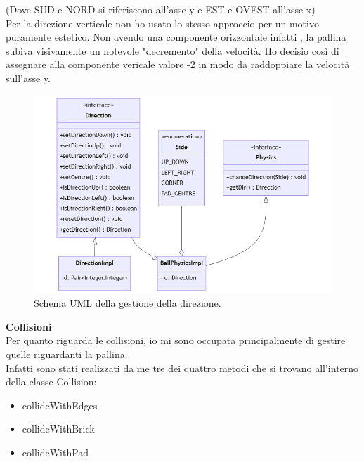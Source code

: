 \documentclass[a4paper,12pt]{report}
\begin{document}
(Dove SUD e NORD si riferiscono all'asse y e EST e OVEST all'asse x)
\\Per la direzione verticale non ho usato lo stesso approccio per un motivo puramente estetico. Non avendo una componente orizzontale infatti , la pallina subiva visivamente un notevole "decremento" della velocità. Ho decisio così di assegnare alla componente vericale valore -2 in modo da raddoppiare la velocità sull'asse y.
\begin{figure}[H]
    \centering{}
    \includegraphics[scale=0.6]{images/Physics.png}
    \caption{Schema UML della gestione della direzione.}
    \label{images:Physics}
\end{figure}
\textbf{Collisioni}\\
Per quanto riguarda le collisioni, io mi sono occupata principalmente di gestire quelle riguardanti la pallina.
\\ Infatti sono stati realizzati da me tre dei quattro metodi che si trovano all'interno della classe Collision:
\begin{itemize}
    \item  collideWithEdges
    \item collideWithBrick
    \item collideWithPad

\end{itemize}
\end{document}

